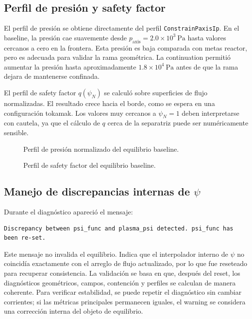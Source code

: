 \documentclass[11pt,a4paper]{article}
\begin{document}
\subsection{Perfil de presión y safety factor}
El perfil de presión se obtiene directamente del perfil \texttt{ConstrainPaxisIp}. En el baseline,
la presión cae suavemente desde $p_{\mathrm{axis}}=2.0\times10^3~\mathrm{Pa}$ hasta valores
cercanos a cero en la frontera. Esta presión es baja comparada con metas reactor, pero es
adecuada para validar la rama geométrica. La continuation permitió aumentar la presión hasta
aproximadamente $1.8\times10^4~\mathrm{Pa}$ antes de que la rama dejara de mantenerse confinada.

El perfil de safety factor $q(\psi_N)$ se calculó sobre superficies de flujo normalizadas. El
resultado crece hacia el borde, como se espera en una configuración tokamak. Los valores muy
cercanos a $\psi_N=1$ deben interpretarse con cautela, ya que el cálculo de $q$ cerca de la
separatriz puede ser numéricamente sensible.

\begin{figure}[htbp]
\centering
{}
\caption{Perfil de presión normalizado del equilibrio baseline.}
\label{fig:pressure_profile_placeholder}
\end{figure}

\begin{figure}[htbp]
\centering
{}
\caption{Perfil de safety factor del equilibrio baseline.}
\label{fig:q_profile_placeholder}
\end{figure}

\subsection{Manejo de discrepancias internas de $\psi$}
Durante el diagnóstico apareció el mensaje:

\begin{verbatim}
Discrepancy between psi_func and plasma_psi detected. psi_func has been re-set.
\end{verbatim}

Este mensaje no invalida el equilibrio. Indica que el interpolador interno de $\psi$ no coincidía
exactamente con el arreglo de flujo actualizado, por lo que fue reseteado para recuperar
consistencia. La validación se basa en que, después del reset, los diagnósticos geométricos,
campos, contención y perfiles se calculan de manera coherente. Para verificar estabilidad, se
puede repetir el diagnóstico sin cambiar corrientes; si las métricas principales permanecen
iguales, el warning se considera una corrección interna del objeto de equilibrio.
\end{document}
